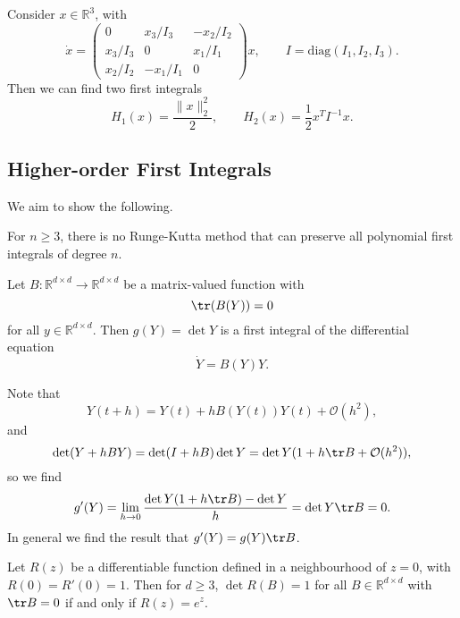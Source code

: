 \documentclass[12pt]{article}
\begin{document}
\begin{exbox}
	Consider $x \in \mathbb{R}^3$, with
	\[
	\dot x = 
	\begin{pmatrix}
		0 & x_3/I_3 & -x_2/I_2 \\
		x_3/I_3 & 0 & x_1/I_1 \\
		x_2/I_2 & - x_1/I_1 & 0
	\end{pmatrix}
	x, \qquad I = \mathrm{diag}(I_1, I_2, I_3).
	\]
	Then we can find two first integrals
	\[
	H_1(x) = \frac{\|x\|_2^2}{2}, \qquad H_2(x) = \frac12 x^{T} I^{-1} x.
	\]
\end{exbox}

\subsection{Higher-order First Integrals}%
\label{sub:hof}

We aim to show the following.

\begin{proposition}
	For $n \geq 3$, there is no Runge-Kutta method that can preserve all polynomial first integrals of degree $n$.
\end{proposition}

\begin{lemma}
	Let $B : \mathbb{R}^{d \times d} \to \mathbb{R}^{d \times d}$ be a matrix-valued function with
	\[
	\tr (B(Y)) = 0
	\]
	for all $y \in \mathbb{R}^{d \times d}$. Then $g(Y) = \det Y$ is a first integral of the differential equation
	\[
	\dot Y = B(Y) Y.
	\]
\end{lemma}

\begin{proofbox}
	Note that
	\[
	Y(t + h) = Y(t) + h B(Y(t)) Y(t) + \mathcal{O}(h^2),
	\]
	and
	\[
	\det (Y + h B Y) = \det(I + h B) \det Y = \det Y (1 + h \tr B + \mathcal{O}(h^2)),
	\]
	so we find
	\[
	g'(Y) = \lim_{h \to 0} \frac{\det Y(1 + h \tr B) - \det Y}{h} = \det Y \tr B = 0.
	\]
	In general we find the result that $g'(Y) = g(Y) \tr B$.
\end{proofbox}

\begin{lemma}
	Let $R(z)$ be a differentiable function defined in a neighbourhood of $z = 0$, with $R(0) = R'(0) = 1$. Then for $d \geq 3$, $\det R(B) = 1$ for all $B \in \mathbb{R}^{d\times d}$ with $\tr B = 0$ if and only if $R(z) = e^{z}$.
\end{lemma}
\end{document}
